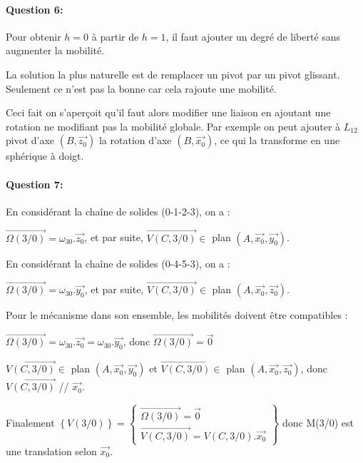 \paragraph{Question 6:}

Pour obtenir $h=0$ à partir de $h=1$, il faut ajouter un degré de liberté sans augmenter la mobilité.

La solution la plus naturelle est de remplacer un pivot par un pivot glissant. Seulement ce n'est pas la bonne car cela rajoute une mobilité.

Ceci fait on s'aperçoit qu'il faut alors modifier une liaison en ajoutant une rotation ne modifiant pas la mobilité globale. Par exemple on peut ajouter à $L_{12}$ pivot d'axe $(B,\overrightarrow{z_0})$ la rotation d'axe $(B,\overrightarrow{x_0})$, ce qui la transforme en une sphérique à doigt.

\paragraph{Question 7:}

En considérant la chaîne de solides (0-1-2-3), on a :

$\overrightarrow{\Omega(3/0)}=\omega_{30}.\overrightarrow{z_0}$, et par suite, $\overrightarrow{V(C,3/0)}\in$ plan $(A,\overrightarrow{x_0},\overrightarrow{y_0})$.

En considérant la chaîne de solides (0-4-5-3), on a :

$\overrightarrow{\Omega(3/0)}=\omega_{30}.\overrightarrow{y_0}$, et par suite, $\overrightarrow{V(C,3/0)}\in$ plan $(A,\overrightarrow{x_0},\overrightarrow{z_0})$.

Pour le mécanisme dans son ensemble, les mobilités doivent être compatibles :

$\overrightarrow{\Omega(3/0)}=\omega_{30}.\overrightarrow{z_0}=\omega_{30}.\overrightarrow{y_0}$, donc $\overrightarrow{\Omega(3/0)}=\overrightarrow{0}$

$\overrightarrow{V(C,3/0)}\in$ plan $(A,\overrightarrow{x_0},\overrightarrow{y_0})$ et $\overrightarrow{V(C,3/0)}\in$ plan $(A,\overrightarrow{x_0},\overrightarrow{z_0})$, donc $\overrightarrow{V(C,3/0)}$ // $\overrightarrow{x_0}$.

Finalement $\left\{V(3/0)\right\}=\left\{\begin{array}{c}\overrightarrow{\Omega(3/0)}=\overrightarrow{0} \\ \overrightarrow{V(C,3/0)}=V(C,3/0).\overrightarrow{x_0}\end{array}
\right\}$ donc M(3/0) est une translation selon $\overrightarrow{x_0}$.


